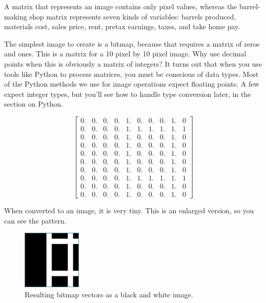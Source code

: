 A matrix that represents an image contains only pixel values, whereas the 
barrel-making shop matrix represents seven kinds of variables: barrels 
produced, materials cost, sales price, rent, pretax earnings, taxes, and take 
home pay. 

The simplest image to create is a bitmap, because that requires a matrix of 
zeros and ones. This is a matrix for a 10 pixel by 10 pixel image. Why use 
decimal points when this is obviously a matrix of integers? It turns out that 
when you use tools like Python to process matrices, you must be conscious of 
data types. Most of the Python methods we use for image operations expect 
floating points. A few expect integer types, but you'll see how to handle type 
conversion later, in the section on Python. 

$$\begin{bmatrix}
0. & 0. & 0. & 0. & 1. & 0. & 0. & 0. & 1. & 0\\
0. & 0. & 0. & 0. & 1. & 1. & 1. & 1. & 1. & 1\\
0. & 0. & 0. & 0. & 1. & 0. & 0. & 0. & 1. & 0\\
0. & 0. & 0. & 0. & 1. & 0. & 0. & 0. & 1. & 0\\
0. & 0. & 0. & 0. & 1. & 0. & 0. & 0. & 1. & 0\\
0. & 0. & 0. & 0. & 1. & 0. & 0. & 0. & 1. & 0\\
0. & 0. & 0. & 0. & 1. & 0. & 0. & 0. & 1. & 0\\
0. & 0. & 0. & 0. & 1. & 1. & 1. & 1. & 1. & 1\\
0. & 0. & 0. & 0. & 1. & 0. & 0. & 0. & 1. & 0\\
0. & 0. & 0. & 0. & 1. & 0. & 0. & 0. & 1. & 0
\end{bmatrix}$$

When converted to an image, it is very tiny. This is an enlarged version, so 
you can see the pattern.

\begin{figure}[htbp]
    \centering
    \includegraphics[width=0.25\textwidth]{normal.png}
    \caption{Resulting bitmap vectors as a black and white image.}
    \label{fig:normal}
\end{figure}

